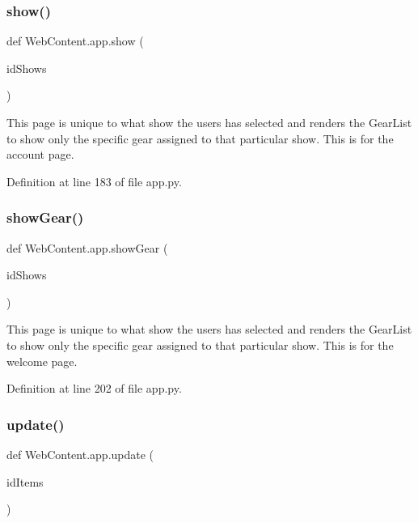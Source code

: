 \subsubsection{\texorpdfstring{show()}{show()}}
{\footnotesize\ttfamily def Web\+Content.\+app.\+show (\begin{DoxyParamCaption}\item[{}]{id\+Shows }\end{DoxyParamCaption})}

\begin{DoxyVerb}This page is unique to what show the users has selected and 
renders the GearList to show only the specific gear assigned
to that particular show. This is for the account page.
\end{DoxyVerb}
 

Definition at line 183 of file app.\+py.

\mbox{\label{namespace_web_content_1_1app_a8a745fdd281519fdc01c26e4ebbc5f87}} 
\subsubsection{\texorpdfstring{show\+Gear()}{showGear()}}
{\footnotesize\ttfamily def Web\+Content.\+app.\+show\+Gear (\begin{DoxyParamCaption}\item[{}]{id\+Shows }\end{DoxyParamCaption})}

\begin{DoxyVerb}This page is unique to what show the users has selected and 
renders the GearList to show only the specific gear assigned
to that particular show. This is for the welcome page.
\end{DoxyVerb}
 

Definition at line 202 of file app.\+py.

\mbox{\label{namespace_web_content_1_1app_a2f6071690c83608f94abb72589ab7527}} 
\subsubsection{\texorpdfstring{update()}{update()}}
{\footnotesize\ttfamily def Web\+Content.\+app.\+update (\begin{DoxyParamCaption}\item[{}]{id\+Items }\end{DoxyParamCaption})}

